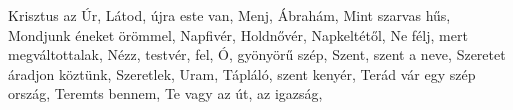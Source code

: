 \begin{multicols}{2}
\begin{minipage}{\textwidth}
Krisztus az Úr, \pageref{KrisztusazC39Ar}\newline
Látod, újra este van, \pageref{LC3A1tod2CC3BAjraestevan}\newline
Menj, Ábrahám, \pageref{Menj2CC381brahC3A1m}\newline
Mint szarvas hűs, \pageref{MintszarvashC5B1s}\newline
Mondjunk éneket örömmel, \pageref{MondjunkC3A9neketC3B6rC3B6mmel}\newline
Napfivér, Holdnővér, \pageref{NapfivC3A9r2CHoldnC591vC3A9r}\newline
Napkeltétől, \pageref{NapkeltC3A9tC591l}\newline
Ne félj, mert megváltottalak, \pageref{NefC3A9lj2CmertmegvC3A1ltottalak}\newline
Nézz, testvér, fel, \pageref{NC3A9zz2CtestvC3A9r2Cfel}\newline
Ó, gyönyörű szép, \pageref{C3932CgyC3B6nyC3B6rC5B1szC3A9p}\newline
Szent, szent a neve, \pageref{Szent2Cszentaneve}\newline
Szeretet áradjon köztünk, \pageref{SzeretetC3A1radjonkC3B6ztC3BCnk}\newline
Szeretlek, Uram, \pageref{Szeretlek2CUram}\newline
Tápláló, szent kenyér, \pageref{TC3A1plC3A1lC3B32CszentkenyC3A9r}\newline
Terád vár egy szép ország, \pageref{TerC3A1dvC3A1regyszC3A9porszC3A1g}\newline
Teremts bennem, \pageref{Teremtsbennem}\newline
Te vagy az út, az igazság, \pageref{TevagyazC3BAt2CazigazsC3A1g}\newline

\end{minipage}
\begin{minipage}{\textwidth}

\end{minipage}
\end{multicols}
